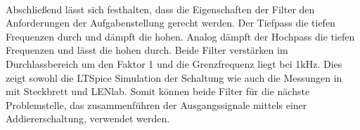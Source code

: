 \\
Abschließend lässt sich festhalten, dass die Eigenschaften der Filter den Anforderungen der Aufgabenstellung gerecht werden. Der Tiefpass die tiefen Frequenzen durch und dämpft die hohen. Analog dämpft der Hochpass die tiefen Frequenzen und lässt die hohen durch. Beide Filter verstärken im Durchlassbereich um den Faktor 1 und die Grenzfrequenz liegt bei 1\si{\kilo\hertz}. Dies zeigt sowohl die LTSpice Simulation der Schaltung wie auch die Messungen in mit Steckbrett und LENlab. Somit können beide Filter für die nächste Problemstelle, das zusammenführen der Ausgangssignale mittels einer Addiererschaltung, verwendet werden. 

